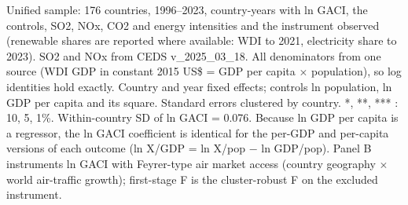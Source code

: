 \begin{table}[htbp]
\begin{minipage}{0.95\textwidth}\footnotesize Unified sample: 176 countries, 1996--2023, country-years with ln GACI, the controls, SO2, NOx, CO2 and energy intensities and the instrument observed (renewable shares are reported where available: WDI to 2021, electricity share to 2023). SO2 and NOx from CEDS v\_2025\_03\_18. All denominators from one source (WDI GDP in constant 2015 US\$ = GDP per capita $\times$ population), so log identities hold exactly. Country and year fixed effects; controls ln population, ln GDP per capita and its square. Standard errors clustered by country. *, **, *** : 10, 5, 1\%. Within-country SD of ln GACI = 0.076. Because ln GDP per capita is a regressor, the ln GACI coefficient is identical for the per-GDP and per-capita versions of each outcome (ln X/GDP = ln X/pop $-$ ln GDP/pop). Panel B instruments ln GACI with Feyrer-type air market access (country geography $\times$ world air-traffic growth); first-stage F is the cluster-robust F on the excluded instrument.\end{minipage}
\end{table}